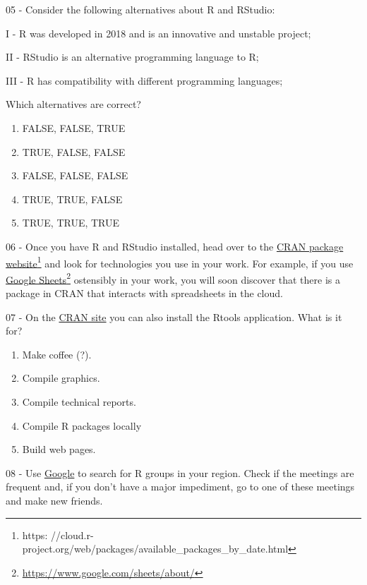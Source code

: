\documentclass[
  12pt,
]{book}
\providecommand{\tightlist}{%
  \setlength{\itemsep}{0pt}\setlength{\parskip}{0pt}}
\begin{document}
05 -
Consider the following alternatives about R and RStudio:

I - R was developed in 2018 and is an innovative and unstable project;

II - RStudio is an alternative programming language to R;

III - R has compatibility with different programming languages;

Which alternatives are correct?

\begin{enumerate}
\def\labelenumi{\alph{enumi})}
\tightlist
\item
  FALSE, FALSE, TRUE
\item
  TRUE, FALSE, FALSE
\item
  FALSE, FALSE, FALSE
\item
  TRUE, TRUE, FALSE
\item
  TRUE, TRUE, TRUE
\end{enumerate}

06 -
Once you have R and RStudio installed, head over to the \href{https://cloud.r-project.org/web/packages/available_packages_by_date.html}{CRAN package website}\footnote{https: //cloud.r- project.org/web/packages/available\_packages\_by\_date.html} and look for technologies you use in your work. For example, if you use \href{https://www.google.com/sheets/about/}{Google Sheets}\footnote{\url{https://www.google.com/sheets/about/}} ostensibly in your work, you will soon discover that there is a package in CRAN that interacts with spreadsheets in the cloud.

07 -
On the \href{https://cloud.r-project.org/bin/windows/}{CRAN site} you can also install the Rtools application. What is it for?

\begin{enumerate}
\def\labelenumi{\alph{enumi})}
\tightlist
\item
  Make coffee (?).
\item
  Compile graphics.
\item
  Compile technical reports.
\item
  Compile R packages locally
\item
  Build web pages.
\end{enumerate}

08 -
Use \href{https://www.google.com/search?q=R+groups+in+my+city}{Google} to search for R groups in your region. Check if the meetings are frequent and, if you don't have a major impediment, go to one of these meetings and make new friends.
\end{document}
